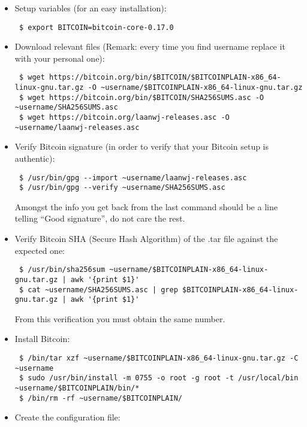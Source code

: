 \begin{itemize}
\item Setup variables (for an easy installation):
\bigskip
\begin{lstlisting}
 $ export BITCOIN=bitcoin-core-0.17.0
\end{lstlisting}
\item Download relevant files (Remark: every time you find username replace it with your personal one):
\bigskip
\begin{lstlisting}
 $ wget https://bitcoin.org/bin/$BITCOIN/$BITCOINPLAIN-x86_64-linux-gnu.tar.gz -O ~username/$BITCOINPLAIN-x86_64-linux-gnu.tar.gz
 $ wget https://bitcoin.org/bin/$BITCOIN/SHA256SUMS.asc -O ~username/SHA256SUMS.asc
 $ wget https://bitcoin.org/laanwj-releases.asc -O ~username/laanwj-releases.asc
\end{lstlisting}
\item Verify Bitcoin signature (in order to verify that your Bitcoin setup is authentic):
\bigskip
\begin{lstlisting}
 $ /usr/bin/gpg --import ~username/laanwj-releases.asc
 $ /usr/bin/gpg --verify ~username/SHA256SUMS.asc
\end{lstlisting}
Amongst the info you get back from the last command should be a line telling \enquote{Good signature}, do not care the rest.
\item Verify Bitcoin SHA (Secure Hash Algorithm) of the .tar file against the expected one:
\bigskip
\begin{lstlisting}
 $ /usr/bin/sha256sum ~username/$BITCOINPLAIN-x86_64-linux-gnu.tar.gz | awk '{print $1}'
 $ cat ~username/SHA256SUMS.asc | grep $BITCOINPLAIN-x86_64-linux-gnu.tar.gz | awk '{print $1}'
\end{lstlisting}
From this verification you must obtain the same number.
\item Install Bitcoin:
\bigskip
\begin{lstlisting}
 $ /bin/tar xzf ~username/$BITCOINPLAIN-x86_64-linux-gnu.tar.gz -C ~username
 $ sudo /usr/bin/install -m 0755 -o root -g root -t /usr/local/bin ~username/$BITCOINPLAIN/bin/*
 $ /bin/rm -rf ~username/$BITCOINPLAIN/
\end{lstlisting}
\item Create the configuration file:


\end{itemize}
